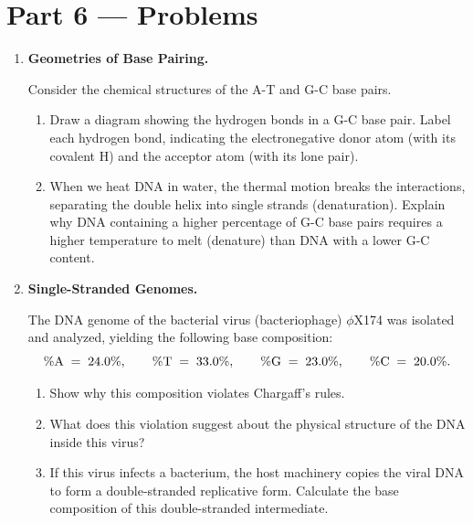 \documentclass[12pt, a4paper]{book}
\begin{document}
\newpage

\section{Part 6 --- Problems}

\begin{problembox}
\begin{enumerate}[label=\textbf{P\arabic*.}]
  \item \textbf{Geometries of Base Pairing.}
  
        Consider the chemical structures of the A-T and G-C base pairs.
        \begin{enumerate}[label=(\alph*)]
          \item Draw a diagram showing the hydrogen bonds in a G-C base pair. Label each hydrogen bond, indicating the electronegative donor atom (with its covalent H) and the acceptor atom (with its lone pair).
          \item When we heat DNA in water, the thermal motion breaks the interactions, separating the double helix into single strands (denaturation).
                Explain why DNA containing a higher percentage of G-C base pairs requires a higher temperature to melt (denature) than DNA with a lower G-C content.
        \end{enumerate}

  \item \textbf{Single-Stranded Genomes.}
  
        The DNA genome of the bacterial virus (bacteriophage) $\phi$X174 was isolated and analyzed, yielding the following base composition:
        \[
          \% \ce{A} \;=\; 24.0\%, \qquad \% \ce{T} \;=\; 33.0\%, \qquad \% \ce{G} \;=\; 23.0\%, \qquad \% \ce{C} \;=\; 20.0\%.
        \]
        \begin{enumerate}[label=(\alph*)]
          \item Show why this composition violates Chargaff's rules.
          \item What does this violation suggest about the physical structure of the DNA inside this virus?
          \item If this virus infects a bacterium, the host machinery copies the viral DNA to form a double-stranded replicative form. Calculate the base composition of this double-stranded intermediate.
        \end{enumerate}
\end{enumerate}
\end{problembox}
\end{document}

